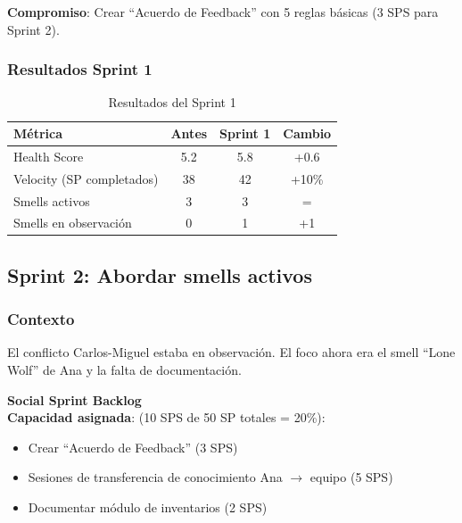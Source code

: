 \textbf{Compromiso}: Crear ``Acuerdo de Feedback'' con 5 reglas básicas (3 SPS para Sprint 2).

\subsubsection{Resultados Sprint 1}

\begin{table}[h]
    \centering
    \small
    \begin{tabularx}{\textwidth}{|X|c|c|c|}
        \hline
        \textbf{Métrica}          & \textbf{Antes} & \textbf{Sprint 1} & \textbf{Cambio} \\ \hline
        Health Score              & 5.2            & 5.8               & +0.6            \\ \hline
        Velocity (SP completados) & 38             & 42                & +10\%           \\ \hline
        Smells activos            & 3              & 3                 & =               \\ \hline
        Smells en observación     & 0              & 1                 & +1              \\ \hline
    \end{tabularx}
    \caption{Resultados del Sprint 1}
    \label{tab:resultados-sprint1}
\end{table}
\FloatBarrier

\subsection{Sprint 2: Abordar smells activos}

\subsubsection{Contexto}

El conflicto Carlos-Miguel estaba en observación. El foco ahora era el smell ``Lone Wolf'' de Ana y la falta de documentación.

\textbf{Social Sprint Backlog}\mbox{}\\[-0.3\baselineskip]

\textbf{Capacidad asignada}: (10 SPS de 50 SP totales = 20\%):
\begin{itemize}
    \item Crear ``Acuerdo de Feedback'' (3 SPS)
    \item Sesiones de transferencia de conocimiento Ana $\rightarrow$ equipo (5 SPS)
    \item Documentar módulo de inventarios (2 SPS)
\end{itemize}

